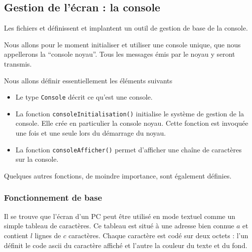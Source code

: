 %
\subsection{Gestion de l'écran : la console}

   Les fichiers  
et  définissent et implantent un outil de
gestion de base de la console.

   Nous allons pour le moment initialiser et utiliser une console
unique, que nous appellerons la ``console noyau''. Tous les messages
émis par le noyau y seront transmis.

   Nous allons définir essentiellement les éléments suivants

\begin{itemize}
   \item Le type \lstinline!Console! décrit ce qu'est une console.
   \item La fonction \lstinline!consoleInitialisation()! initialise le
     système de gestion de la console. Elle crée en particulier la
     console noyau. Cette fonction est invoquée une fois et une seule
     lors du démarrage du noyau.
   \item La fonction \lstinline!consoleAfficher()! permet d'afficher
     une chaîne de caractères sur la console.
\end{itemize}  

   Quelques autres fonctions, de moindre importance, sont également
définies.
   
%
\subsubsection{Fonctionnement de base}

   Il se trouve que l'écran d'un PC peut être utilisé en mode textuel
comme un simple tableau de caractères. Ce tableau est situé à une
adresse bien connue $a$ et contient $l$ lignes de $c$
caractères. Chaque caractère est codé sur deux octets : l'un définit
le code {\sc ascii} du caractère affiché et l'autre la couleur du
texte et du fond. 

%
